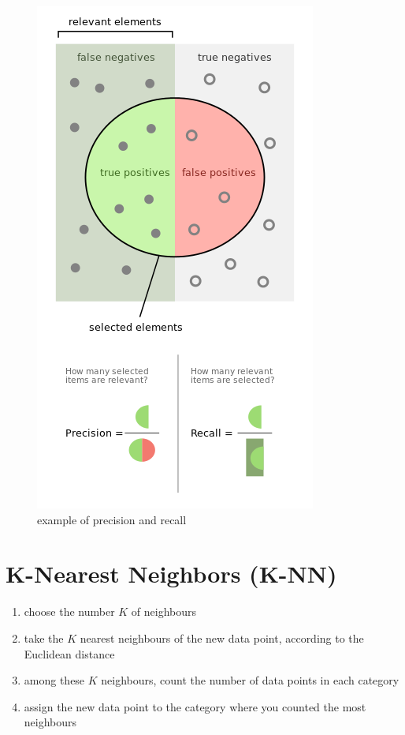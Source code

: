 \begin{figure}
	\includegraphics[width=\linewidth]{./figures/precision_recall.png}
	\centering
	\caption{example of precision and recall}
\end{figure}

\section{K-Nearest Neighbors (K-NN)}
\begin{enumerate}
	\item choose the number $K$ of neighbours
	\item take the $K$ nearest neighbours of the new data point, according to the Euclidean distance
	\item among these $K$ neighbours, count the number of data points in each category
	\item assign the new data point to the category where you counted the most neighbours
\end{enumerate}




